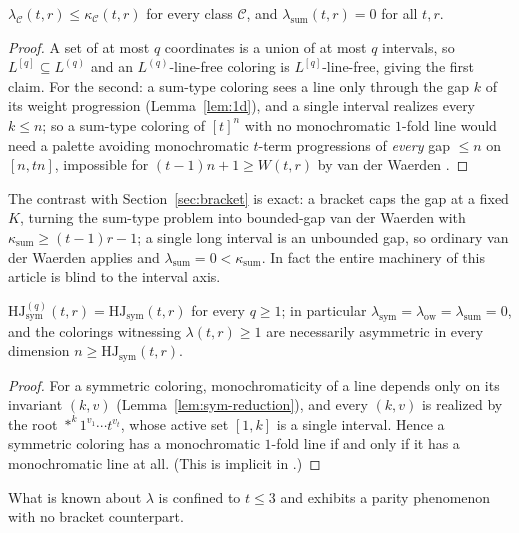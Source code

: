 \documentclass[12pt]{article}
\newcommand{\HJ}{\mathrm{HJ}}
\newcommand{\Wvdw}{W}
\newcommand{\Ls}{L}
\newcommand{\ksum}{\kappa_{\mathrm{sum}}}
\begin{document}
\begin{proposition}\label{prop:interval-vs-bracket}
$\lambda_{\mathcal{C}}(t,r)\le\kappa_{\mathcal{C}}(t,r)$ for every
class $\mathcal{C}$, and $\lambda_{\mathrm{sum}}(t,r)=0$ for all $t,r$.
\end{proposition}

\begin{proof}
A set of at most $q$ coordinates is a union of at most $q$ intervals,
so $\Ls^{[q]}\subseteq\Ls^{(q)}$ and an $\Ls^{(q)}$-line-free coloring
is $\Ls^{[q]}$-line-free, giving the first claim. For the second: a
sum-type coloring sees a line only through the gap $k$ of its weight
progression (Lemma~\ref{lem:1d}), and a single interval realizes every
$k\le n$; so a sum-type coloring of $[t]^{n}$ with no monochromatic
$1$-fold line would need a palette avoiding monochromatic $t$-term
progressions of \emph{every} gap $\le n$ on $[n,tn]$, impossible for
$(t-1)n+1\ge\Wvdw(t,r)$ by van der Waerden \cite{vanderWaerden1927}.
\end{proof}

The contrast with Section~\ref{sec:bracket} is exact: a bracket caps
the gap at a fixed $K$, turning the sum-type problem into bounded-gap
van der Waerden with $\ksum\ge(t-1)r-1$; a single long interval is an
unbounded gap, so ordinary van der Waerden applies and
$\lambda_{\mathrm{sum}}=0<\ksum$. In fact the entire machinery of this
article is blind to the interval axis.

\begin{proposition}\label{prop:sym-blind}
$\HJ^{(q)}_{\mathrm{sym}}(t,r)=\HJ_{\mathrm{sym}}(t,r)$ for every
$q\ge 1$; in particular
$\lambda_{\mathrm{sym}}=\lambda_{\mathrm{ow}}=\lambda_{\mathrm{sum}}=0$,
and the colorings witnessing $\lambda(t,r)\ge 1$ are necessarily
asymmetric in every dimension $n\ge\HJ_{\mathrm{sym}}(t,r)$.
\end{proposition}

\begin{proof}
For a symmetric coloring, monochromaticity of a line depends only on
its invariant $(k,v)$ (Lemma~\ref{lem:sym-reduction}), and every
$(k,v)$ is realized by the root ${*}^{k}1^{v_{1}}\cdots t^{v_{t}}$,
whose active set $[1,k]$ is a single interval. Hence a symmetric
coloring has a monochromatic $1$-fold line if and only if it has a
monochromatic line at all. (This is implicit in \cite{thesis}.)
\end{proof}

What is known about $\lambda$ is confined to $t\le 3$ and exhibits a
parity phenomenon with no bracket counterpart.
\end{document}
